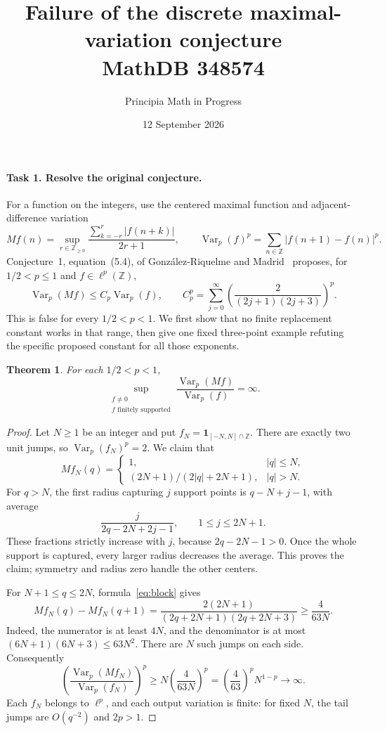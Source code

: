 \documentclass[11pt]{article}
\title{Failure of the discrete maximal-variation conjecture\\
\large MathDB 348574}
\author{Principia Math in Progress}
\date{12 September 2026}
\newtheorem{theorem}{Theorem}
\DeclareMathOperator{\Var}{Var}
\begin{document}
\maketitle

\paragraph{Task 1. Resolve the original conjecture.}
For a function on the integers, use the centered maximal function and
adjacent-difference variation
\[
Mf(n)=\sup_{r\in\mathbb Z_{\geq0}}
\frac{\sum_{k=-r}^r|f(n+k)|}{2r+1},
\qquad
\Var_p(f)^p=\sum_{n\in\mathbb Z}|f(n+1)-f(n)|^p.
\]
Conjecture~1, equation~(5.4), of Gonz\'alez-Riquelme and
Madrid~\cite{source} proposes, for \(1/2<p\leq1\) and
\(f\in\ell^p(\mathbb Z)\),
\begin{equation}\label{eq:conjecture}
\Var_p(Mf)\leq C_p\Var_p(f),\qquad
C_p^p=\sum_{j=0}^{\infty}
\left(\frac{2}{(2j+1)(2j+3)}\right)^p.
\end{equation}
This is false for every \(1/2<p<1\). We first show that no finite
replacement constant works in that range, then give one fixed
three-point example refuting the specific proposed constant for all
those exponents.

\begin{theorem}\label{thm:unbounded}
For each \(1/2<p<1\),
\[
\sup_{\substack{f\ne0\\ f\text{ finitely supported}}}
\frac{\Var_p(Mf)}{\Var_p(f)}=\infty.
\]
\end{theorem}
\begin{proof}
Let \(N\geq1\) be an integer and put
\(f_N=\mathbf1_{[-N,N]\cap\mathbb Z}\).
There are exactly two unit jumps, so \(\Var_p(f_N)^p=2\).
We claim that
\begin{equation}\label{eq:block}
Mf_N(q)=
\begin{cases}
1,&|q|\leq N,\\[1mm]
(2N+1)/(2|q|+2N+1),&|q|>N.
\end{cases}
\end{equation}
For \(q>N\), the first radius capturing \(j\) support points is
\(q-N+j-1\), with average
\[
\frac{j}{2q-2N+2j-1},\qquad 1\leq j\leq2N+1.
\]
These fractions strictly increase with \(j\), because \(2q-2N-1>0\).
Once the whole support is captured, every larger radius decreases the
average. This proves the claim; symmetry and radius zero handle the
other centers.

For \(N+1\leq q\leq2N\), formula~\eqref{eq:block} gives
\[
Mf_N(q)-Mf_N(q+1)
=\frac{2(2N+1)}{(2q+2N+1)(2q+2N+3)}
\geq\frac4{63N}.
\]
Indeed, the numerator is at least \(4N\), and the denominator is at
most \((6N+1)(6N+3)\leq63N^2\).
There are \(N\) such jumps on each side. Consequently
\[
\left(\frac{\Var_p(Mf_N)}{\Var_p(f_N)}\right)^p
\geq N\left(\frac4{63N}\right)^p
=\left(\frac4{63}\right)^pN^{1-p}\longrightarrow\infty.
\]
Each \(f_N\) belongs to \(\ell^p\), and each output variation is finite:
for fixed \(N\), the tail jumps are \(O(q^{-2})\) and \(2p>1\).
\end{proof}
\end{document}
